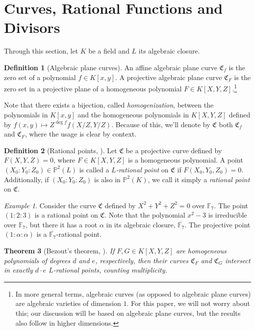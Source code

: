 \documentclass[11pt, oneside]{amsart}
\newtheorem{thm}{Theorem}[section]
\theoremstyle{definition}
\newtheorem{defn}[thm]{Definition}
\theoremstyle{remark}
\newtheorem*{exmp*}{Example}
\numberwithin{equation}{section}
\begin{document}
\section{Curves, Rational Functions and Divisors}

Through this section, let $K$ be a field and $L$ its algebraic closure.

\begin{defn}[Algebraic plane curves]
	An affine algebraic plane curve $\mathfrak C_f$ is the zero set of a polynomial $f \in K[x, y]$.
	A projective algebraic plane curve $\mathfrak C_F$ is the zero set in a projective plane of a homogeneous polynomial $F \in K[X, Y, Z]$.\footnote{In more general terms, algebraic curves (as opposed to algebraic plane curves) are algebraic varieties of dimension $1$. For this paper, we will not worry about this; our discussion will be based on algebraic plane curves, but the results also follow in higher dimensions.}
\end{defn}


Note that there exists a bijection, called \emph{homogenization}, between the polynomials in $K[x, y]$ and the homogeneous polynomials in $K[X, Y, Z]$ defined by $f(x, y) \mapsto Z^{\deg f}f(X/Z, Y/Z)$.
Because of this, we'll denote by $\mathfrak C$ both $\mathfrak C_f$ and $\mathfrak C_F$, where the usage is clear by context.

\begin{defn}[Rational points, \cite{Wal00}] %
	Let $\mathfrak C$ be a projective curve defined by $F(X, Y, Z) = 0$, where $F \in K[X, Y, Z]$ is a homogeneous polynomial.
	A point $(X_0 : Y_0 : Z_0) \in \mathbb{P}^2(L)$ is called a \emph{$L$-rational point} on $\mathfrak C$ if $F(X_0, Y_0, Z_0) = 0$.
	Additionally, if $(X_0 : Y_0 : Z_0)$ is also in $\mathbb{P}^2(K)$, we call it simply a \emph{rational point} on $\mathfrak C$.
\end{defn}

\begin{exmp*}
	Consider the curve $\mathfrak C$ defined by $X^2 + Y^2 + Z^2 = 0$ over $\mathbb{F}_7$.
	The point $(1 : 2 : 3)$ is a rational point on $\mathfrak C$.
	Note that the polynomial $x^2 - 3$ is irreducible over $\mathbb{F}_7$, but there it has a root $\alpha$ in its algebraic closure, $\overline{\mathbb{F}_7}$. The projective point $(1 :  \alpha : \alpha)$ is a $\overline{\mathbb{F}_7}$-rational point.
\end{exmp*}


\begin{thm}[Bezout's theorem, \cite{Wal00}] %
	If $F, G \in K[X, Y, Z]$ are homogeneous polynomials of degrees $d$ and $e$, respectively, then their curves $\mathfrak C_F$ and $\mathfrak C_G$ intersect in exactly $d\cdot e$ $L$-rational points, counting multiplicity.
\end{thm}
\end{document}
